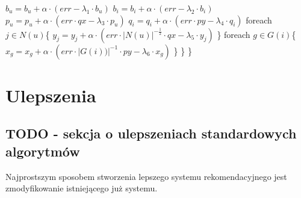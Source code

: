 \documentclass{pracamgr}
\begin{document}
    \hspace*{48pt}			$b_u=b_u+\alpha\cdot(err-\lambda_1\cdot b_u)$\newline
    \hspace*{48pt}			$b_i=b_i+\alpha\cdot(err-\lambda_2\cdot b_i)$\newline
    \hspace*{48pt}			$p_u=p_u+\alpha\cdot(err\cdot qx-\lambda_3\cdot p_u)$\newline
    \hspace*{48pt}			$q_i=q_i+\alpha\cdot(err\cdot py-\lambda_4\cdot q_i)$\newline
    \hspace*{48pt}			foreach $j\in N(u)$\{\newline
    \hspace*{64pt}				$y_j=y_j+\alpha\cdot(err\cdot |N(u)|^{-\frac{1}{2}}\cdot qx-\lambda_5\cdot y_j)$\newline
    \hspace*{48pt}			\}\newline
    \hspace*{48pt}			foreach $g\in G(i)$\{\newline
    \hspace*{64pt}				$x_g=x_g+\alpha\cdot(err\cdot |G(i))|^{-1}\cdot py-\lambda_6\cdot x_g)$\newline
    \hspace*{48pt}			\}\newline
    \hspace*{32pt}		\}\newline
    \hspace*{16pt}	\}\newline
 \chapter{Ulepszenia}
  \section{TODO - sekcja o ulepszeniach standardowych algorytmów}
   Najprostszym sposobem stworzenia lepszego systemu rekomendacyjnego jest zmodyfikowanie istniejącego już systemu.\newline
   
\end{document}
